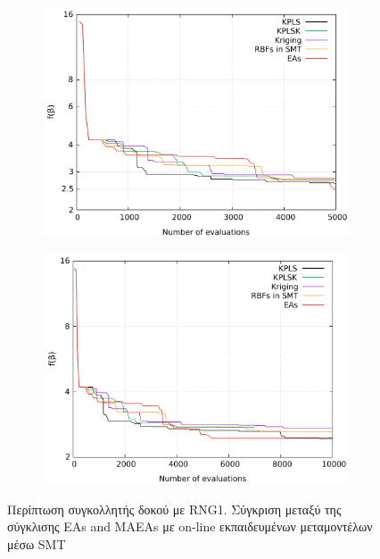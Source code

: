 \documentclass[twoside, 12pt,notitlepage]{report}
\begin{document}
\begin{enumerate}
\begin{figure}[h!]
\centering
	\begin{subfigure}[b]{0.49\textwidth}
	\centering
	\includegraphics[width=\textwidth, height = 0.7\textwidth, 
	scale=1]{welded_beam_online_comparison.pdf}
	\end{subfigure}
	\hfill
	\begin{subfigure}[b]{0.49\textwidth}
	\centering
	\includegraphics[width=\textwidth, height = 0.7\textwidth, 
	scale=1]{welded_beam_online_comparison2.pdf}
	\end{subfigure}   
\caption{Περίπτωση συγκολλητής δοκού με RNG1. Σύγκριση μεταξύ της 
σύγκλισης EAs and MAEAs με on-line εκπαιδευμένων μεταμοντέλων μέσω 
SMT} 
\end{figure}

\newpage



\end{enumerate}
\end{document}
